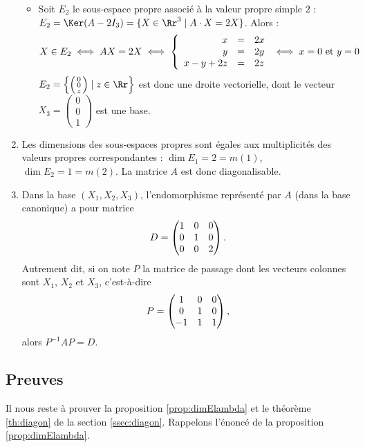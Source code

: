 \documentclass[12pt, class=report,crop=false]{standalone}
\begin{document}
\begin{exemple}
\begin{enumerate}
\begin{itemize}
    
    \item Soit $E_2$ le sous-espace propre associé à la valeur propre simple $2$ : $E_2 = \Ker(A-2I_3) = \{ X \in\Rr^3 \mid  A\cdot X=2X\}$. Alors : 
$$X\in E_2\iff AX=2X \iff \left\{\begin{array}{rcl}
x&=&2x\cr 
y&=&2y\cr 
x-y+2z&=&2z
\end{array}\right.\iff x=0 \text{ et } y=0$$
$E_2 = \left\lbrace\left(\begin{smallmatrix}0\\0\\z\end{smallmatrix}\right) \mid z \in \Rr\right\rbrace$ est donc une droite vectorielle, dont le vecteur $X_3=\left(\begin{smallmatrix}0\\0\\1\end{smallmatrix}\right)$ est une base.

    
  \end{itemize}
  
  
  \item Les dimensions des sous-espaces propres sont égales aux  multiplicités des valeurs propres correspondantes :
  $\dim E_1 = 2 = m(1)$, $\dim E_2 = 1 = m(2)$. La matrice $A$ est donc diagonalisable.
  
  
  \item Dans la base $(X_1, X_2, X_3)$, l'endomorphisme représenté par $A$ (dans la base canonique) a pour matrice
$$D=\left(\begin{matrix}1&0&0\cr 0&1&0\cr 0&0&2\end{matrix}\right).$$
Autrement dit, si on note $P$ la matrice de passage dont les vecteurs colonnes sont $X_1$, $X_2$ et $X_3$, c'est-à-dire
$$P=\begin{pmatrix}1&0&0\cr 0&1&0\cr -1&1&1\end{pmatrix},$$
alors $P^{-1}AP=D$.
\end{enumerate}

\end{exemple}



\subsection{Preuves}
\label{ssec:preuvesdiagon}

Il nous reste à prouver la proposition \ref{prop:dimElambda} et le théorème \ref{th:diagon} de la section \ref{ssec:diagon}.
Rappelons l'énoncé de la proposition \ref{prop:dimElambda}.
\end{document}
